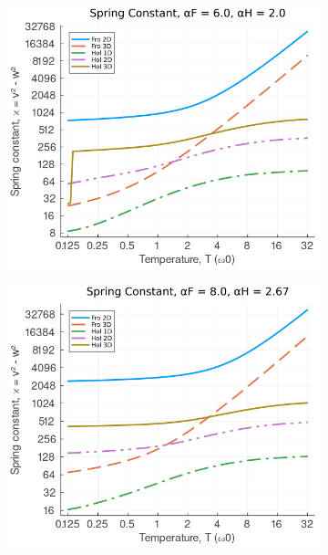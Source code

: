 \begin{figure}[!tbp]
\begin{subfigure}[b]{0.49\textwidth}
    \includegraphics[width=\textwidth]{figures/spring_temp_6_2.png}
  \end{subfigure}
  \hfill
  \begin{subfigure}[b]{0.49\textwidth}
    \includegraphics[width=\textwidth]{figures/spring_temp_8_267.png}
  \end{subfigure}
  \begin{subfigure}[b]{0.49\textwidth}

\end{subfigure}
\end{figure}

